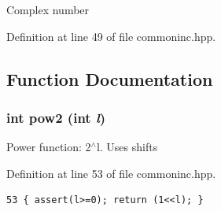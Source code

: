 Complex number 

Definition at line 49 of file commoninc.hpp.

\subsection{Function Documentation}
\subsubsection{\setlength{\rightskip}{0pt plus 5cm}int pow2 (int {\em l})\hspace{0.3cm}{\tt  [inline]}}\label{commoninc_8hpp_0b93292da4c9021812deec8f372b431e_0b93292da4c9021812deec8f372b431e}


Power function: 2$^\wedge$l. Uses shifts 

Definition at line 53 of file commoninc.hpp.

\footnotesize\begin{verbatim}53 { assert(l>=0); return (1<<l); }
\end{verbatim}\normalsize 


